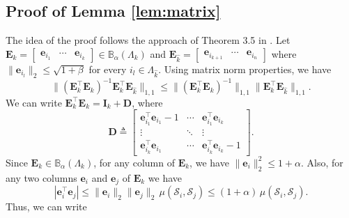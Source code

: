 \documentclass[10pt,twocolumn,twoside] {IEEEtran}
\begin{document}
{\subsection{Proof of Lemma \ref{lem:matrix} }
\label{app:lemmatrix}
\noindent The idea of the proof follows the approach of Theorem 3.5 in \cite{Tropp:TIT04}. Let ${\boldsymbol{E}}_k  = \begin{bmatrix} {\boldsymbol{e}}_{i_1} \!\!& \cdots \!\! & {\boldsymbol{e}}_{i_k} \end{bmatrix} \in \mathbb{B}_{\alpha}(\Lambda_k)$ and ${\boldsymbol{E}}_{\widehat{k}} = \begin{bmatrix} {\boldsymbol{e}}_{i_{k+1}} \!\!& \cdots \!\! & {\boldsymbol{e}}_{i_n} \end{bmatrix}$ where $\| {\boldsymbol{e}}_{i_l} \|_2 \leq \sqrt{1+\beta}$ for every $i_l \in \Lambda_{\widehat{k}}$. Using matrix norm properties, we have
\begin{equation}
\label{eq:interm111}
 \| ({\boldsymbol{E}}_k^{\top} {\boldsymbol{E}}_k)^{-1}{\boldsymbol{E}}_k^{\top} {\boldsymbol{E}}_{\widehat{k}} \|_{1,1} \leq   \| ({\boldsymbol{E}}_k^{\top} {\boldsymbol{E}}_k)^{-1} \|_{1,1} \| {\boldsymbol{E}}_k^{\top} {\boldsymbol{E}}_{\widehat{k}} \|_{1,1}.
\end{equation}
We can write ${\boldsymbol{E}}_k^{\top} {\boldsymbol{E}}_k = {\boldsymbol{I}}_k +  {\boldsymbol{D}}$, where
\begin{equation}
{\boldsymbol{D}} \triangleq \begin{bmatrix} {\boldsymbol{e}}_{i_1}^{\top} {\boldsymbol{e}}_{i_1} -1 & \cdots & {\boldsymbol{e}}_{i_1}^{\top} {\boldsymbol{e}}_{i_k} \\ \vdots & \ddots & \vdots \\ {\boldsymbol{e}}_{i_k}^{\top} {\boldsymbol{e}}_{i_1} & \cdots & {\boldsymbol{e}}_{i_k}^{\top} {\boldsymbol{e}}_{i_k}-1  \end{bmatrix}. 
\end{equation}
Since ${\boldsymbol{E}}_k \in \mathbb{B}_{\alpha}(\Lambda_k)$, for any column of ${\boldsymbol{E}}_k$, we have $\| {\boldsymbol{e}}_i \|_2^2 \leq 1+\alpha$. Also, for any two columns ${\boldsymbol{e}}_i$ and ${\boldsymbol{e}}_j$ of ${\boldsymbol{E}}_k$ we have
\begin{equation}
| {\boldsymbol{e}}_i^{\top} {\boldsymbol{e}}_j | \leq \| {\boldsymbol{e}}_i \|_2 \| {\boldsymbol{e}}_j \|_2 \, \mu(\mathcal{S}_i,\mathcal{S}_j) \leq (1+\alpha) \, \mu(\mathcal{S}_i,\mathcal{S}_j).
\end{equation}
Thus, we can write 
}
\end{document}
